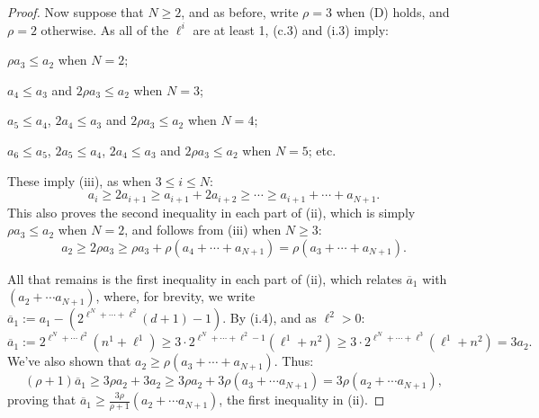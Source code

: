 \documentclass[10pt]{article}
\begin{document}
\begin{KoszulSequenceCombinatorics}
\begin{proof}
Now suppose that $N\geq2$, and as before, write $\rho=3$ when \textup{(D)} holds, and $\rho=2$ otherwise. As all of the $\ell^i$ are at least 1, \textup{(c.3)} and \textup{(i.3)} imply:
\begin{itemise}
\item $\rho a_3\leq a_2$ when $N=2$;
\item $a_4\leq a_3$ and $2\rho a_3\leq a_2$ when $N=3$;
\item $a_5\leq a_4$, $2a_4\leq a_3$ and $2\rho a_3\leq a_2$ when $N=4$;
\item $a_6\leq a_5$, $2a_5\leq a_4$, $2a_4\leq a_3$ and $2\rho a_3\leq a_2$ when $N=5$; etc.
\end{itemise}
These imply (iii), as when $3\leq i\leq N$:
\[a_i\geq 2a_{i+1}\geq a_{i+1}+2a_{i+2}\geq\cdots \geq a_{i+1}+\cdots +a_{N+1}.\]
This also proves the second inequality in each part of (ii), which is simply $\rho a_3\leq a_2$ when $N=2$, and follows from (iii) when $N\geq3$:
\[a_2\geq 2\rho a_3\geq \rho a_3+\rho (a_4+\cdots +a_{N+1})=\rho (a_3+\cdots +a_{N+1}).\]

All that remains is the first inequality in each part of (ii), which relates $\overline{a}_1$ with $(a_2+\cdots a_{N+1})$, where, for brevity, we write $\overline{a}_1:=a_1-(2^{\ell^N+\cdots +\ell^2}(d+1)-1)$.
By \textup{(i.4)}, and as $\ell^2>0$:%
\[\overline{a}_1:=2^{\ell^N+\cdots \ell^2}(n^1+\ell^1)\geq 3\cdot2^{\ell^N+\cdots +\ell^2-1}(\ell^1+n^2)\geq 3\cdot2^{\ell^N+\cdots +\ell^3}(\ell^1+n^2) =3a_2.\]
We've also shown that $a_2\geq\rho (a_3+\cdots +a_{N+1})$. Thus:
\[(\rho+1)\overline{a}_1\geq 3\rho a_2+3a_2 \geq 3\rho a_2+3\rho (a_3+\cdots a_{N+1})=3\rho(a_2+\cdots a_{N+1}),\]
proving that $\overline{a}_1\geq\frac{3\rho}{\rho+1}(a_2+\cdots a_{N+1})$,  the first inequality in (ii).
\end{proof}


\end{KoszulSequenceCombinatorics}
\end{document}
